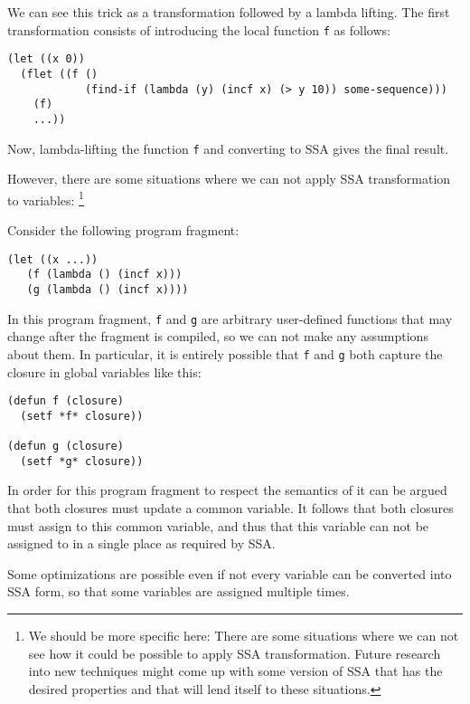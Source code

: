 We can see this trick as a transformation followed by a lambda
lifting.  The first transformation consists of introducing the local
function \texttt{f} as follows:

\begin{verbatim}
(let ((x 0))
  (flet ((f ()
            (find-if (lambda (y) (incf x) (> y 10)) some-sequence)))
    (f)
    ...)) 
\end{verbatim}

Now, lambda-lifting the function \texttt{f} and converting to SSA
gives the final result. 

However, there are some situations where we can not apply SSA
transformation to variables:%
\footnote{We should be more specific here: There are some situations
  where we can not see how it could be possible to apply SSA
  transformation.  Future research into new techniques might come up
  with some version of SSA that has the desired properties and that
  will lend itself to these situations.}

Consider the following program fragment:

\begin{verbatim}
(let ((x ...))
   (f (lambda () (incf x)))
   (g (lambda () (incf x))))
\end{verbatim}

In this program fragment, \texttt{f} and \texttt{g} are arbitrary
user-defined functions that may change after the fragment is compiled,
so we can not make any assumptions about them.  In particular, it is
entirely possible that \texttt{f} and \texttt{g} both capture the
closure in global variables like this:

\begin{verbatim}
(defun f (closure)
  (setf *f* closure))

(defun g (closure)
  (setf *g* closure))
\end{verbatim}

In order for this program fragment to respect the semantics of \commonlisp{}
it can be argued that both closures must update a common variable.  It
follows that both closures must assign to this common variable, and
thus that this variable can not be assigned to in a single place as
required by SSA. 

Some optimizations are possible even if not every variable can be
converted into SSA form, so that some variables are assigned multiple
times.  

